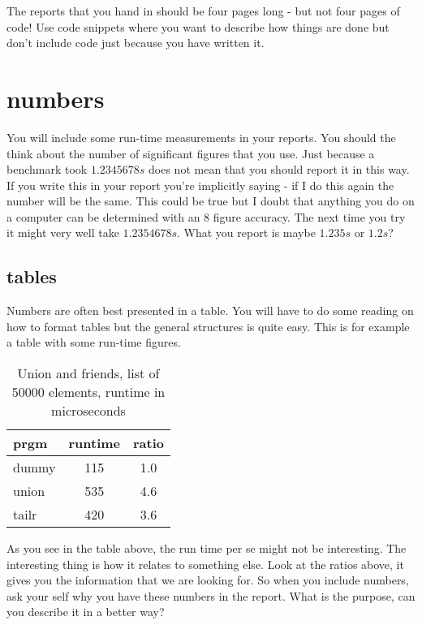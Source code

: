 \documentclass[a4paper,11pt]{article}
\begin{document}
The reports that you hand in should be four pages long - but not four
pages of code! Use code snippets where you want to describe how things
are done but don't include code just because you have written it. 

\section*{numbers}

You will include some run-time measurements in your reports. You
should the think about the number of significant figures that you
use. Just because a benchmark took $1.2345678 s$ does not mean that
you should report it in this way. If you write this in your report
you're implicitly saying - if I do this again the number will be the
same. This could be true but I doubt that anything you do on a
computer can be determined with an 8 figure accuracy. The next time
you try it might very well take $1.2354678 s$. What you report is
maybe $1.235 s$ or $1.2 s$?

\subsection*{tables}

Numbers are often best presented in a table. You will have to do some
reading on how to format tables but the general structures is quite
easy. This is for example a table with some run-time figures.

\begin{table}[h]
\begin{center}
\begin{tabular}{l|c|c}
\textbf{prgm} & \textbf{runtime} & \textbf{ratio}\\
\hline
  dummy      &  115 &     1.0\\
  union      &  535 &     4.6\\
  tailr      &  420 &     3.6\\
\end{tabular}
\caption{Union and friends, list of 50000 elements, runtime in microseconds}
\label{tab:table1}
\end{center}
\end{table}

As you see in the table above, the run time per se might not be
interesting. The interesting thing is how it relates to something
else. Look at the ratios above, it gives you the information that we
are looking for. So when you include numbers, ask your self why you
have these numbers in the report. What is the purpose, can you
describe it in a better way?
\end{document}
